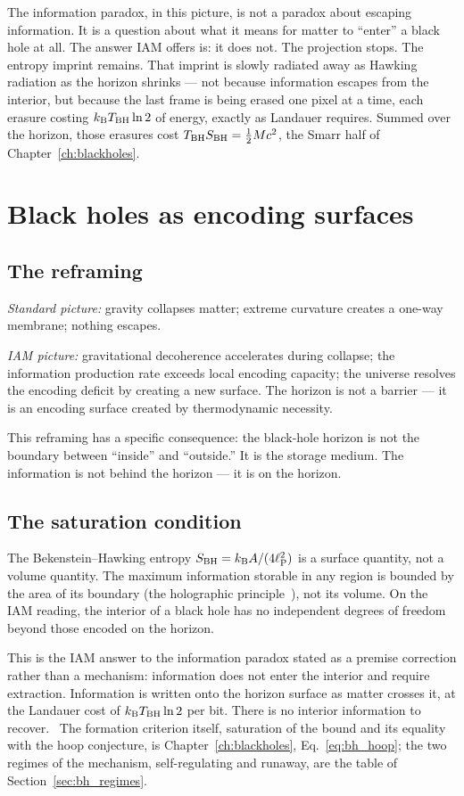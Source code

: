 The information paradox, in this picture, is not a paradox about escaping information. It is a question about what it means for matter to ``enter'' a black
hole at all. The answer IAM offers is: it does not. The projection stops. The entropy imprint remains. That imprint is slowly radiated away as Hawking
radiation as the horizon shrinks --- not because information escapes from the interior, but because the last frame is being erased one pixel at a time, each
erasure costing $k_{\mathrm B} T_{\rm BH}\ln2$ of energy, exactly as Landauer requires. Summed over the horizon, those erasures cost $T_{\rm BH}S_{\rm BH}=\tfrac12Mc^2$, the Smarr
half of Chapter~\ref{ch:blackholes}. \interp

\section{Black holes as encoding surfaces}\label{sec:bi_surfaces}
\subsection{The reframing}
\emph{Standard picture:} gravity collapses matter; extreme curvature creates a one-way membrane; nothing escapes.

\emph{IAM picture:} gravitational decoherence accelerates during collapse; the information production rate exceeds local encoding capacity; the universe
resolves the encoding deficit by creating a new surface. The horizon is not a barrier --- it is an encoding surface created by thermodynamic necessity.
\conjecture

This reframing has a specific consequence: the black-hole horizon is not the boundary between ``inside'' and ``outside.'' It is the storage medium. The
information is not behind the horizon --- it is on the horizon.

\subsection{The saturation condition}
The Bekenstein--Hawking entropy $S_{\rm BH}=k_{\mathrm B} A/(4\ell_{\mathrm P}^2)$ is a surface quantity, not a volume quantity. The maximum information storable in any region is bounded
by the area of its boundary (the holographic principle~\cite{tHooft1993,Susskind1995}), not its volume. On the IAM reading, the interior of a black hole has no
independent degrees of freedom beyond those encoded on the horizon.

This is the IAM answer to the information paradox stated as a premise correction rather than a mechanism: information does not enter the interior and
require extraction. Information is written onto the horizon surface as matter crosses it, at the Landauer cost of $k_{\mathrm B} T_{\rm BH}\ln2$ per bit. There is no
interior information to recover. \conjecture\ The formation criterion itself, saturation of the bound and its equality with the hoop conjecture, is
Chapter~\ref{ch:blackholes}, Eq.~\eqref{eq:bh_hoop}; the two regimes of the mechanism, self-regulating and runaway, are the table of
Section~\ref{sec:bh_regimes}.

